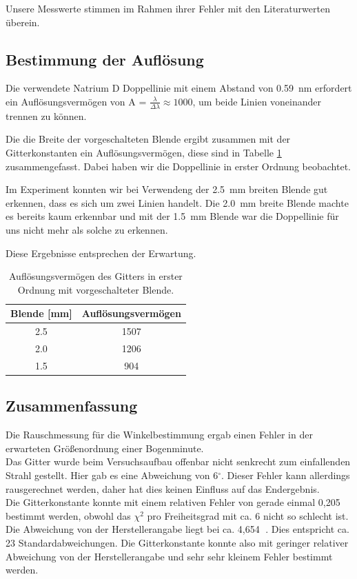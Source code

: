 \documentclass[12pt,a4paper]{article}
\begin{document}
	Unsere Messwerte stimmen im Rahmen ihrer Fehler mit den Literaturwerten überein.
	
	\subsection{Bestimmung der Auflösung}
	
	Die verwendete Natrium D Doppellinie mit einem Abstand von \SI{0.59}{nm} erfordert ein Auflösungsvermögen von A = $\frac{\lambda}{\Delta\lambda} \approx 1000 $, um beide Linien voneinander trennen zu können.
	
	Die die Breite der vorgeschalteten Blende ergibt zusammen mit der Gitterkonstanten ein Auflösungsvermögen, diese sind in Tabelle \ref{tab:gitter_auflösung} zusammengefasst. Dabei haben wir die Doppellinie in erster Ordnung beobachtet.
	
	Im Experiment konnten wir bei Verwendeng der \SI{2.5}{mm} breiten Blende gut erkennen, dass es sich um zwei Linien handelt. Die \SI{2.0}{mm} breite Blende machte es bereits kaum erkennbar und mit der \SI{1.5}{mm} Blende war die Doppellinie für uns nicht mehr als solche zu erkennen.
	
	Diese Ergebnisse entsprechen der Erwartung.
	
	\begin{table}
		\centering
		\begin{tabular}{|c|c|}
			\hline
			Blende [mm] & Auflösungsvermögen \\
			\hline \hline
			2.5 & 1507 \\
			\hline
			2.0 & 1206 \\
			\hline
			1.5 & 904 \\
			\hline
		\end{tabular}
		\caption{Auflösungsvermögen des Gitters in erster Ordnung mit vorgeschalteter Blende.}
		\label{tab:gitter_auflösung}
	\end{table}
	
\subsection{Zusammenfassung}
Die Rauschmessung für die Winkelbestimmung ergab einen Fehler in der erwarteten Größenordnung einer Bogenminute.\\
Das Gitter wurde beim Versuchsaufbau offenbar nicht senkrecht zum einfallenden Strahl gestellt. Hier gab es eine Abweichung von 6$^{\circ}$. Dieser Fehler kann allerdings rausgerechnet werden, daher hat dies keinen Einfluss auf das Endergebnis.\\
Die Gitterkonstante konnte mit einem relativen Fehler von gerade einmal 0,205 \textperthousand $\;$ bestimmt werden, obwohl das $\chi ^2$ pro Freiheitsgrad mit ca. 6 nicht so schlecht ist. Die Abweichung von der Herstellerangabe liegt bei ca. 4,654 \textperthousand $\;$. Dies entspricht ca. 23 Standardabweichungen. Die Gitterkonstante konnte also mit geringer relativer Abweichung von der Herstellerangabe und sehr sehr kleinem Fehler bestimmt werden.
	
	
\end{document}
